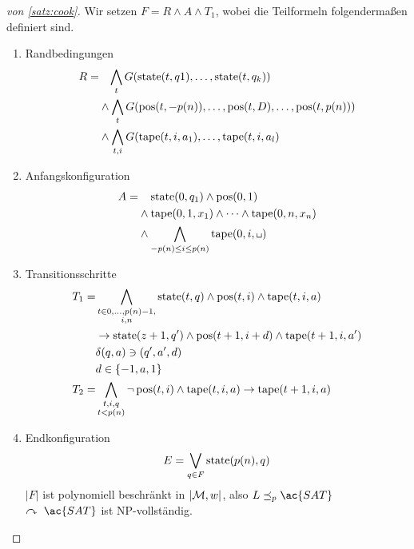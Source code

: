\begin{proof}[von \autoref{satz:cook}]
	Wir setzen $F = R \land A\land T_1$, wobei die Teilformeln folgendermaßen definiert sind.
	\begin{enumerate}
	\item Randbedingungen
		\begin{align*}
			R =&\phantom{\land}\, \bigwedge_t G(\operatorname{state}(t,q1),\dots,\operatorname{state}(t,q_k))\\
			& \land \bigwedge_t G(\operatorname{pos}(t,-p(n)),\dots,\operatorname{pos}(t,D),\dots,\operatorname{pos}(t,p(n)))\\
			& \land \bigwedge_{t,i} G(\operatorname{tape}(t,i,a_1),\dots,\operatorname{tape}(t,i,a_l)
		\end{align*}
	\item Anfangskonfiguration
		\begin{align*}
			A =&\phantom{\land}\; \state(0,q_1)\land \pos(0,1)\\
			&\land\tape(0,1,x_1)\land\dots\land\tape(0,n,x_n)\\
			&\land\bigwedge_{-p(n)\leq i\leq p(n)} \tape(0,i,\blank)
		\end{align*}
	\item Transitionsschritte
	\begin{align*}
		T_1 =& \bigwedge_{\substack{t\in 0,\dots,p(n)-1,\\i,n}} \state(t,q)\land \pos(t,i) \land \tape(t,i,a)\\
		&\-> \state(z+1,q')\land \pos(t+1,i+d) \land \tape(t+1,i,a')\\
		&\delta(q,a)\ni(q',a',d)\\
		&d\in\{-1,a,1\}\\
		T_2 =& \bigwedge_{\substack{t,i,q\\t<p(n)}} \neg \pos(t,i)\land \tape(t,i,a) \-> \tape(t+1,i,a)
	\end{align*}
	\item Endkonfiguration
		\[ E = \bigvee_{q\in F} \operatorname{state}(p(n),q) \]
		$|F|$ ist polynomiell beschränkt in $|\mathcal{M},w|$, also $L\preceq_p \ac{SAT}$\\
		$\curvearrowright\ \ac{SAT}$ ist \ac{NP}-vollständig.
	\end{enumerate}
\end{proof}











